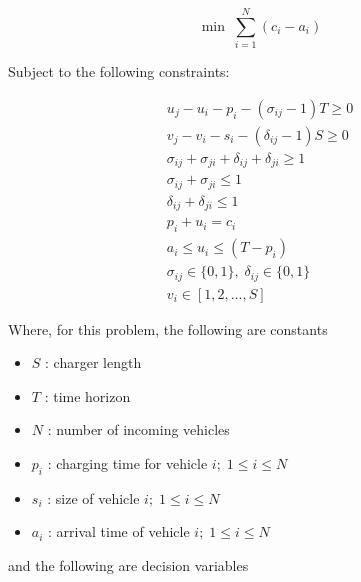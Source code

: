 \documentclass[letterpaper, 10pt, conference]{IEEEtran}
\begin{document}
\begin{equation}
	\label{eq:bapobjective}
	\min\; \sum_{i=1}^N (c_i - a_i)
\end{equation}

Subject to the following constraints:

\begin{subequations}
\label{eq:bapconstrs}
\begin{align}
    u_j - u_i - p_i - (\sigma_{ij} - 1)T \geq 0                   \label{subeq:baptime}         \\
    v_j - v_i - s_i - (\delta_{ij} - 1)S \geq 0                   \label{subeq:bapspace}        \\
    \sigma_{ij} + \sigma_{ji} + \delta_{ij} + \delta_{ji} \geq 1  \label{subeq:bapvalid_pos}    \\
    \sigma_{ij} + \sigma_{ji} \leq 1                              \label{subeq:bapsigma}        \\
    \delta_{ij} + \delta_{ji} \leq 1                              \label{subeq:bapdelta}        \\
    p_i + u_i = c_i                                               \label{subeq:bapdetach}       \\
    a_i \leq u_i \leq (T - p_i)                                   \label{subeq:bapvalid_starts} \\
    \sigma_{ij} \in \{0,1\},\;\delta_{ij} \in \{0,1\}\;           \label{subeq:bapsdspace}      \\
    v_i \in [1,2,...,S]                                           \label{subeq:bapvspace}
\end{align}
\end{subequations}

\noindent
Where, for this problem, the following are constants

\begin{itemize}
	\item $S$   : charger length
	\item $T$   : time horizon
	\item $N$   : number of incoming vehicles
	\item $p_i$ : charging time for vehicle $i;\; 1 \leq i \leq N$
	\item $s_i$ : size of vehicle $i;\; 1 \leq i \leq N$
	\item $a_i$ : arrival time of vehicle $i;\; 1 \leq i \leq N$
\end{itemize}

\noindent
and the following are decision variables
\end{document}
